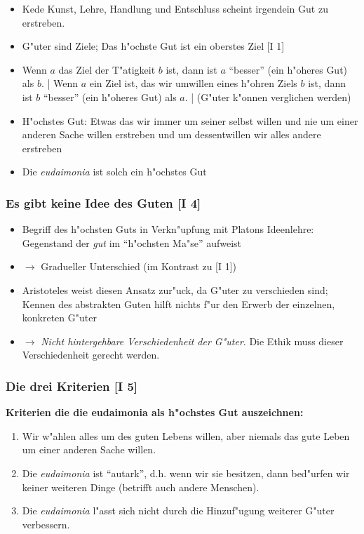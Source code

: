 \documentclass[emulatestandardclasses]{scrartcl}
\begin{document}
\begin{itemize}
  \item Kede Kunst, Lehre, Handlung und Entschluss scheint irgendein Gut zu erstreben.
  \item G"uter sind Ziele; Das h"ochste Gut ist ein oberstes Ziel [I 1]
  \item Wenn $a$ das Ziel der T"atigkeit $b$ ist, dann ist $a$ "`besser"' (ein h"oheres Gut) als $b$. | Wenn $a$ ein Ziel ist, das wir umwillen eines h"ohren Ziels $b$ ist, dann ist $b$ "`besser"' (ein h"oheres Gut) als $a$.  | (G"uter k"onnen verglichen werden)
  \item H"ochstes Gut: Etwas das wir immer um seiner selbst willen und nie um einer anderen Sache willen erstreben und um dessentwillen wir alles andere erstreben
  \item Die \emph{eudaimonia} ist solch ein h"ochstes Gut
\end{itemize}

\subsubsection{Es gibt keine Idee des Guten [I 4]}

\begin{itemize}
  \item Begriff des h"ochsten Guts in Verkn"upfung mit Platons Ideenlehre: Gegenstand der \emph{gut} im "`h"ochsten Ma"se"' aufweist
  \item $\rightarrow$ Gradueller Unterschied (im Kontrast zu [I 1])
  \item Aristoteles weist diesen Ansatz zur"uck, da G"uter zu verschieden sind; Kennen des abstrakten Guten hilft nichts f"ur den Erwerb der einzelnen, konkreten G"uter
  \item $\rightarrow$ \emph{Nicht hintergehbare Verschiedenheit der G"uter}. Die Ethik muss dieser Verschiedenheit gerecht werden.
\end{itemize}

\subsubsection{Die drei Kriterien [I 5]}

\noindent \textbf{Kriterien die die eudaimonia als h"ochstes Gut auszeichnen:}

\begin{enumerate}
  \item Wir w"ahlen alles um des guten Lebens willen, aber niemals das gute Leben um einer anderen Sache willen.
  \item Die \emph{eudaimonia} ist "`autark"', d.h. wenn wir sie besitzen, dann bed"urfen wir keiner weiteren Dinge (betrifft auch andere Menschen).
  \item Die \emph{eudaimonia} l"asst sich nicht durch die Hinzuf"ugung weiterer G"uter verbessern.
\end{enumerate}
\end{document}
